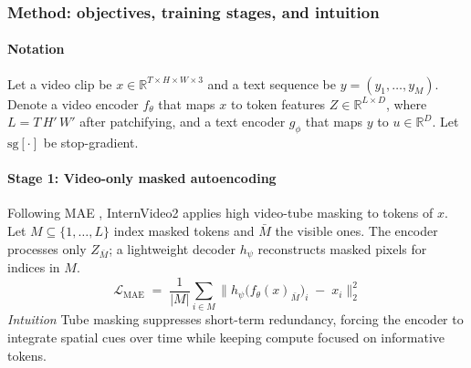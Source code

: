 \begin{enrichment}
\begin{enrichment}
        \subsubsection{Method: objectives, training stages, and intuition}
        \label{subsubsec:chapter24_internvideo2_method}
        \paragraph{Notation}
        Let a video clip be $x\in\mathbb{R}^{T\times H\times W\times 3}$ and a text sequence be $y=(y_1,\dots,y_M)$. Denote a video encoder $f_\theta$ that maps $x$ to token features $Z\in\mathbb{R}^{L\times D}$, where $L=T\,H'\,W'$ after patchifying, and a text encoder $g_\phi$ that maps $y$ to $u\in\mathbb{R}^{D}$. Let $\text{sg}[\cdot]$ be stop-gradient.
        
        \paragraph{Stage 1: Video-only masked autoencoding}
        Following MAE \cite{he2022_mae}, InternVideo2 applies high video-tube masking to tokens of $x$. Let $M\subseteq\{1,\dots,L\}$ index masked tokens and $\bar M$ the visible ones. The encoder processes only $Z_{\bar M}$; a lightweight decoder $h_\psi$ reconstructs masked pixels for indices in $M$.
        \begin{equation}
            \mathcal{L}_{\text{MAE}} \;=\; \frac{1}{|M|} \sum_{i\in M} \big\| h_\psi\big( f_\theta(x)_{\bar M} \big)_i \;{-}\; x_i \big\|_2^2
            \label{eq:chapter24_iv2_mae}
        \end{equation}
        \emph{Intuition} Tube masking suppresses short-term redundancy, forcing the encoder to integrate spatial cues over time while keeping compute focused on informative tokens.
        

\end{enrichment}
\end{enrichment}

